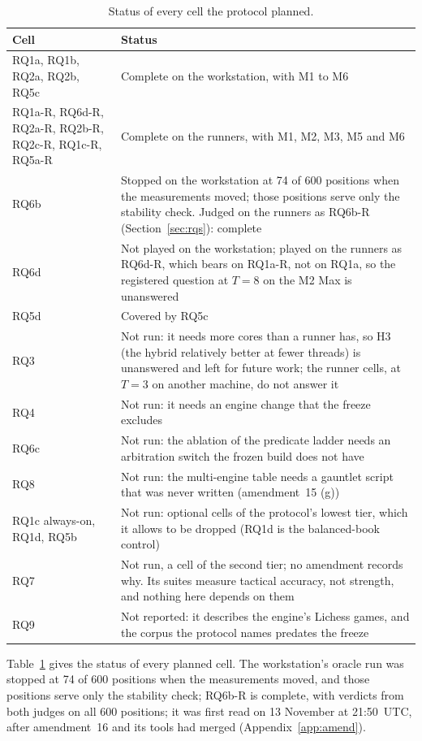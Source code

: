 \documentclass{article}
\begin{document}
\begin{table}[t]
\centering
\caption{Status of every cell the protocol planned.}
\label{tab:status}
\footnotesize
\begin{tabular}{p{4.6cm}p{10.2cm}}
\toprule
Cell & Status \\
\midrule
RQ1a, RQ1b, RQ2a, RQ2b, RQ5c & Complete on the workstation, with M1 to M6 \\
\mbox{RQ1a-R}, \mbox{RQ6d-R}, \mbox{RQ2a-R}, \mbox{RQ2b-R}, \mbox{RQ2c-R}, \mbox{RQ1c-R}, \mbox{RQ5a-R} & Complete on the runners, with M1, M2, M3, M5 and M6 \\
RQ6b & Stopped on the workstation at 74 of 600 positions when the measurements moved; those positions serve only the stability check. Judged on the runners as RQ6b-R (Section~\ref{sec:rqs}): complete \\
RQ6d & Not played on the workstation; played on the runners as RQ6d-R, which bears on RQ1a-R, not on RQ1a, so the registered question at $T = 8$ on the M2 Max is unanswered \\
RQ5d & Covered by RQ5c \\
RQ3 & Not run: it needs more cores than a runner has, so H3 (the hybrid relatively better at fewer threads) is unanswered and left for future work; the runner cells, at $T = 3$ on another machine, do not answer it \\
RQ4 & Not run: it needs an engine change that the freeze excludes \\
RQ6c & Not run: the ablation of the predicate ladder needs an arbitration switch the frozen build does not have \\
RQ8 & Not run: the multi-engine table needs a gauntlet script that was never written (amendment~15 (g)) \\
RQ1c always-on, RQ1d, RQ5b & Not run: optional cells of the protocol's lowest tier, which it allows to be dropped (RQ1d is the balanced-book control) \\
RQ7 & Not run, a cell of the second tier; no amendment records why. Its suites measure tactical accuracy, not strength, and nothing here depends on them \\
RQ9 & Not reported: it describes the engine's Lichess games, and the corpus the protocol names predates the freeze \\
\bottomrule
\end{tabular}
\end{table}
Table~\ref{tab:status} gives the status of every planned cell. The workstation's oracle run was stopped at 74 of 600 positions when the measurements moved, and those positions serve only the stability check; RQ6b-R is complete, with verdicts from both judges on all 600 positions; it was first read on 13 November at 21:50~UTC, after amendment~16 and its tools had merged (Appendix~\ref{app:amend}).
\end{document}
